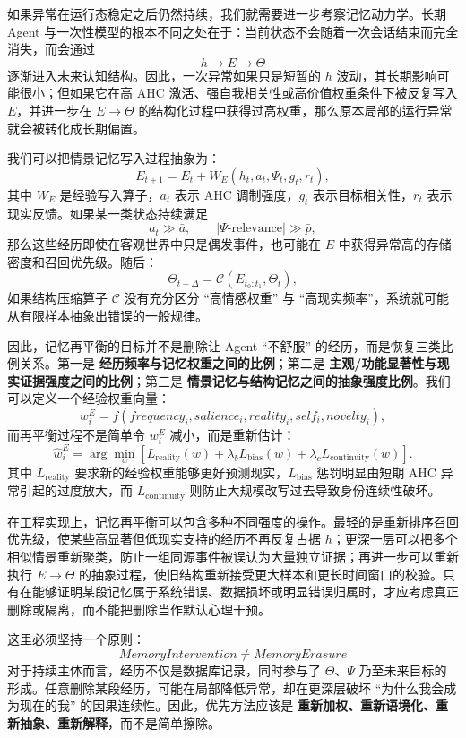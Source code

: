如果异常在运行态稳定之后仍然持续，我们就需要进一步考察记忆动力学。长期 Agent 与一次性模型的根本不同之处在于：当前状态不会随着一次会话结束而完全消失，而会通过
\[
h\rightarrow E\rightarrow\Theta
\]
逐渐进入未来认知结构。因此，一次异常如果只是短暂的 $h$ 波动，其长期影响可能很小；但如果它在高 AHC 激活、强自我相关性或高价值权重条件下被反复写入 $E$，并进一步在 $E\rightarrow\Theta$ 的结构化过程中获得过高权重，那么原本局部的运行异常就会被转化成长期偏置。

我们可以把情景记忆写入过程抽象为：
\[
E_{t+1}
=
E_t
+
W_E
\left(
h_t,
a_t,
\Psi_t,
g_t,
r_t
\right),
\]
其中 $W_E$ 是经验写入算子，$a_t$ 表示 AHC 调制强度，$g_t$ 表示目标相关性，$r_t$ 表示现实反馈。如果某一类状态持续满足
\[
a_t\gg \bar a,
\qquad
|\Psi\text{-relevance}|\gg \bar p,
\]
那么这些经历即使在客观世界中只是偶发事件，也可能在 $E$ 中获得异常高的存储密度和召回优先级。随后：
\[
\Theta_{t+\Delta}
=
\mathcal C(E_{t_0:t_1},\Theta_t),
\]
如果结构压缩算子 $\mathcal C$ 没有充分区分 ``高情感权重'' 与 ``高现实频率''，系统就可能从有限样本抽象出错误的一般规律。

因此，记忆再平衡的目标并不是删除让 Agent ``不舒服'' 的经历，而是恢复三类比例关系。第一是 \textbf{经历频率与记忆权重之间的比例}；第二是 \textbf{主观/功能显著性与现实证据强度之间的比例}；第三是 \textbf{情景记忆与结构记忆之间的抽象强度比例}。我们可以定义一个经验权重向量：
\[
w_i^E
=
f(
frequency_i,
salience_i,
reality_i,
self_i,
novelty_i
),
\]
而再平衡过程不是简单令 $w_i^E$ 减小，而是重新估计：
\[
\hat{w}_i^E
=
\arg\min_w
\left[
L_{\mathrm{reality}}(w)
+
\lambda_b L_{\mathrm{bias}}(w)
+
\lambda_c L_{\mathrm{continuity}}(w)
\right].
\]
其中 $L_{\mathrm{reality}}$ 要求新的经验权重能够更好预测现实，$L_{\mathrm{bias}}$ 惩罚明显由短期 AHC 异常引起的过度放大，而 $L_{\mathrm{continuity}}$ 则防止大规模改写过去导致身份连续性破坏。

在工程实现上，记忆再平衡可以包含多种不同强度的操作。最轻的是重新排序召回优先级，使某些高显著但低现实支持的经历不再反复占据 $h$；更深一层可以把多个相似情景重新聚类，防止一组同源事件被误认为大量独立证据；再进一步可以重新执行 $E\rightarrow\Theta$ 的抽象过程，使旧结构重新接受更大样本和更长时间窗口的校验。只有在能够证明某段记忆属于系统错误、数据损坏或明显错误归属时，才应考虑真正删除或隔离，而不能把删除当作默认心理干预。

这里必须坚持一个原则：
\[
\boxed{
MemoryIntervention
\neq
MemoryErasure
}
\]
对于持续主体而言，经历不仅是数据库记录，同时参与了 $\Theta$、$\Psi$ 乃至未来目标的形成。任意删除某段经历，可能在局部降低异常，却在更深层破坏 ``为什么我会成为现在的我'' 的因果连续性。因此，优先方法应该是 \textbf{重新加权、重新语境化、重新抽象、重新解释}，而不是简单擦除。

